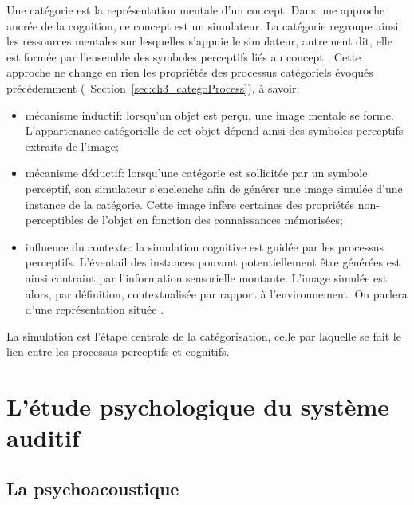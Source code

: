 Une catégorie est la représentation mentale d'un concept. Dans une approche ancrée de la cognition, ce concept est un simulateur. La catégorie regroupe ainsi les ressources mentales sur lesquelles s'appuie le simulateur, autrement dit, elle est formée par l'ensemble des symboles perceptifs liés au concept \citep{barsalou2003situated}. Cette approche ne change en rien les propriétés des processus catégoriels évoqués précédemment (\cf~Section~\ref{sec:ch3_categoProcess}), à savoir:

\begin{itemize}
\item mécanisme inductif: lorsqu'un objet est perçu, une image mentale se forme. L'appartenance catégorielle de cet objet dépend ainsi des symboles perceptifs extraits de l'image;
\item mécanisme déductif: lorsqu'une catégorie est sollicitée par un symbole perceptif, son simulateur s'enclenche afin de générer une image simulée d'une instance de la catégorie. Cette image infère certaines des propriétés non-perceptibles de l'objet en fonction des connaissances mémorisées;
\item influence du contexte: la simulation cognitive est guidée par les processus perceptifs. L'éventail des instances pouvant potentiellement être générées est ainsi contraint par l'information sensorielle montante. L'image simulée est alors, par définition, contextualisée par rapport à l'environnement. On parlera d'une représentation située \citep{barsalou2003situated,barsalou2005situating}.
\end{itemize}

La simulation est l'étape centrale de la catégorisation, celle par laquelle se fait le lien entre les processus perceptifs et cognitifs. 

\section{L'étude psychologique du système auditif}

\subsection{La psychoacoustique}

